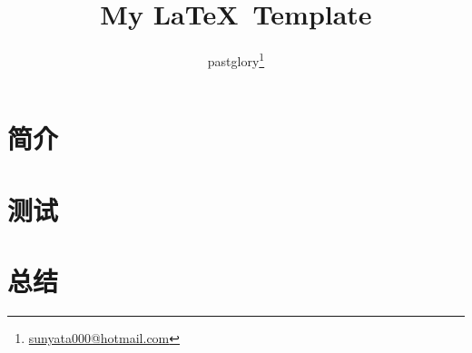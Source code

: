 \documentclass[zh, a4paper, 12pt]{pgreport}
\title {My \LaTeX\ Template}
\author{pastglory\thanks{\href{mailto:sunyata000@hotmail.com}{sunyata000@hotmail.com}}}
\date{}
\begin{document}
\maketitle
\tableofcontents

\newpage

\begin{abstract}
    \normalsize
    
\end{abstract}

\newpage

\section{简介}


\section{测试}


\section{总结}



\end{document}
